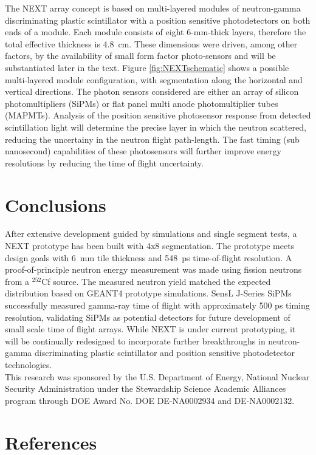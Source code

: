 \documentclass[preprint,3p,twocolumn]{elsarticle}
\begin{document}
The NEXT array concept is based on multi-layered modules of neutron-gamma discriminating plastic scintillator with a position sensitive photodetectors on both ends of a module. Each module consists of eight 6-mm-thick layers, therefore the total effective thickness is 4.8~cm. These dimensions were driven, among other factors, by the availability of small form factor photo-sensors and will be substantiated later in the text. Figure \ref{fig:NEXTschematic} shows a possible multi-layered module configuration, with segmentation along the horizontal and vertical directions. The photon sensors considered are either an array of silicon photomultipliers (SiPMs) or flat panel multi anode photomultiplier tubes (MAPMTs). Analysis of the position sensitive photosensor response from detected scintillation light will determine the precise layer in which the neutron scattered, reducing the uncertainy in the neutron flight path-length. The fast timing (sub nanosecond) capabilities of these photosensors will further improve energy resolutions by reducing the time of flight uncertainty. 





\section{Conclusions}
After extensive development guided by simulations and single segment tests, a NEXT prototype has been built with 4x8 segmentation. The prototype meets design goals with 6~mm tile thickness and 548~ps time-of-flight resolution. A proof-of-principle neutron energy measurement was made using fission neutrons from a $^{252}$Cf source. The measured neutron yield matched the expected distribution based on GEANT4 prototype simulations.
SensL\textsuperscript{\texttrademark} J-Series SiPMs successfully measured gamma-ray time of flight with approximately 500 ps timing resolution, validating SiPMs as potential detectors for future development of small scale time of flight arrays.
While NEXT is under current prototyping, it will be continually redesigned to incorporate further breakthroughs in neutron-gamma discriminating plastic scintillator and position sensitive photodetector technologies.\\
This research was sponsored by the U.S. Department of Energy, National Nuclear Security Administration under the Stewardship Science Academic Alliances program through DOE Award No. DOE DE-NA0002934 and DE-NA0002132.

\section*{References}
%

\end{document}
